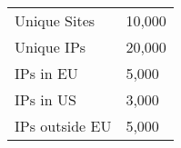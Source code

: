 \begin{tabular}{ll}
  \toprule
  \toprule
  \midrule
  Unique Sites & 10,000 \\
  Unique IPs & 20,000 \\
  IPs in EU & 5,000 \\
  IPs in US & 3,000 \\
  IPs outside EU & 5,000 \\
  \bottomrule
\end{tabular}
